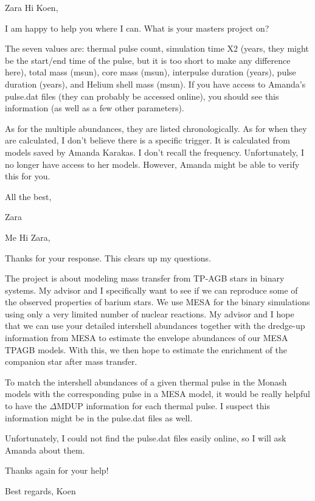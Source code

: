 \documentclass[a4paper,10pt]{article}
\begin{document}
\hspace{0.1\textwidth}\begin{minipage}{1.45\textwidth}
\begin{shadequote}{Zara}
Hi Koen,

I am happy to help you where I can. What is your masters project on?

The seven values are: thermal pulse count, simulation time X2 (years, they might be the start/end time of the pulse, but it is too short to make any difference here), total mass (msun), core mass (msun), interpulse duration (years), pulse duration (years), and Helium shell mass (msun). If you have access to Amanda's pulse.dat files (they can probably be accessed online), you should see this information (as well as a few other parameters). 

As for the multiple abundances, they are listed chronologically. As for when they are calculated, I don't believe there is a specific trigger. It is calculated from models saved by Amanda Karakas.  I don't recall the frequency. Unfortunately, I no longer have access to her models. However, Amanda might be able to verify this for you.

All the best,

Zara
\end{shadequote}
\end{minipage}

\hspace{0.2\textwidth}\begin{minipage}{1.35\textwidth}
\begin{shadequote}{Me}
Hi Zara,

Thanks for your response. This clears up my questions.

The project is about modeling mass transfer from TP-AGB stars in binary systems. My advisor and I specifically want to see if we can reproduce some of the observed properties of barium stars. We use MESA for the binary simulations using only a very limited number of nuclear reactions. My advisor and I hope that we can use your detailed intershell abundances together with the dredge-up information from MESA to estimate the envelope abundances of our MESA TPAGB models. With this, we then hope to estimate the enrichment of the companion star after mass transfer.

To match the intershell abundances of a given thermal pulse in the Monash models with the corresponding pulse in a MESA model, it would be really helpful to have the \(\Delta\)MDUP information for each thermal pulse. I suspect this information might be in the pulse.dat files as well.

Unfortunately, I could not find the pulse.dat files easily online, so I will ask Amanda about them.

Thanks again for your help!

Best regards,
Koen
\end{shadequote}
\end{minipage}
\end{document}
